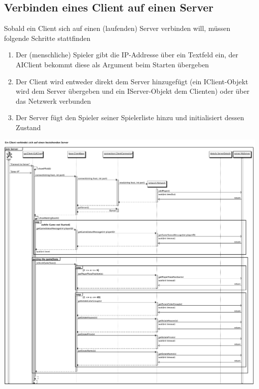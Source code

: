 \documentclass[a4paper,10pt]{article}
\begin{document}
\subsection{Verbinden eines Client auf einen Server}
Sobald ein Client sich auf einen (laufenden) Server verbinden will, müssen folgende Schritte stattfinden
\begin{enumerate}
\item Der (menschliche) Spieler gibt die IP-Addresse über ein Textfeld ein, der AIClient bekommt diese als Argument beim Starten übergeben
\item Der Client wird entweder direkt dem Server hinzugefügt (ein IClient-Objekt wird dem Server übergeben und ein IServer-Objekt dem Clienten) oder über das Netzwerk verbunden
\item Der Server fügt den Spieler seiner Spielerliste hinzu und initialisiert dessen Zustand
\end{enumerate}
\includegraphics[width=17cm]{Sequenzdiagramme/client_verbinden}
\end{document}
